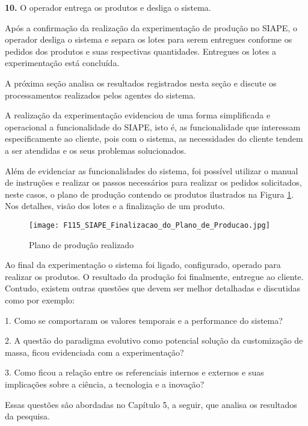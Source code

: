 		
		\textbf{10.} O operador entrega os produtos e desliga o sistema. 
		
		
		Após a confirmação da realização da experimentação de produção no SIAPE, o operador desliga o sistema e separa os lotes para serem entregues conforme os pedidos dos produtos e suas respectivas quantidades. Entregues os lotes a experimentação está concluída.
		
		A próxima seção analisa os resultados registrados nesta seção e discute os processamentos realizados pelos agentes do sistema.
		
		\begin{center}
		
		\end{center}	
			
		A realização da experimentação evidenciou de uma forma simplificada e operacional a funcionalidade do  SIAPE, isto é, as funcionalidade que interessam especificamente ao cliente, pois com o sistema, as necessidades do cliente tendem a ser atendidas e os seus problemas solucionados.\par 
		Além de evidenciar as funcionalidades do sistema, foi possível utilizar o manual de instruções e realizar os passos necessários para realizar os pedidos solicitados, neste casos, o plano de produção contendo os produtos ilustrados na Figura  \ref{F115}. Nos detalhes, visão dos lotes e a  finalização de um produto.\par
		
		\begin{figure}[!h]
			\centering
			\texttt{[image: F115\_SIAPE\_Finalizacao\_do\_Plano\_de\_Producao.jpg]} 
			\caption{Plano de produção realizado}
			\label{F115}
		\end{figure}
		
		Ao final da experimentação o sistema foi ligado, configurado, operado para realizar os produtos. O resultado da produção foi finalmente,   entregue ao cliente. Contudo, existem outras questões que devem ser melhor detalhadas e discutidas como por exemplo:\par 
		1. Como se comportaram os valores temporais e a performance do sistema? \par 
		2. A questão do paradigma evolutivo como potencial solução da customização de massa, ficou evidenciada com a experimentação?\par 
		3. Como ficou a relação entre os referenciais internos e externos e suas  implicações sobre a ciência, a tecnologia e a inovação? \par 
		Essas questões são abordadas no Capítulo 5, a seguir, que analisa os resultados da pesquisa. 
		
